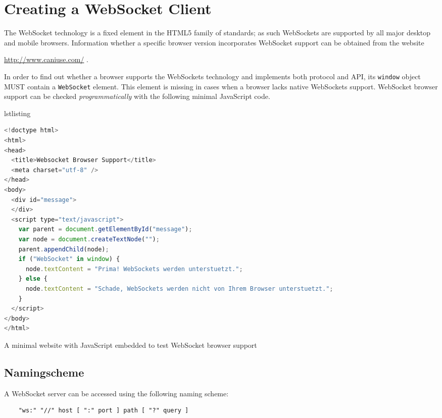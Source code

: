 \documentclass[a4paper, justified, notoc]{tufte-handout} %
\makeatletter
\newenvironment{listing}[1][htbp] %
  {\ifvmode\else\unskip\fi\begin{@tufte@float}[#1]{lstlisting}{}}
  {\end{@tufte@float} } %
\makeatother
\begin{document}
\section{Creating a WebSocket Client} %
\label{sec:creating_a_websocket_client}
The WebSocket technology is a fixed element in the HTML5 family of standards; as such WebSockets are supported by all major desktop and mobile browsers. Information whether a specific browser version incorporates WebSocket support can be obtained from the website 

\url{http://www.caniuse.com/} .

In order to find out whether a browser supports the WebSockets technology and implements both protocol and API, its \texttt{window} object MUST contain a \texttt{WebSocket} element. This element is missing in cases when a browser lacks native WebSockets support. WebSocket browser support can be checked \emph{programmatically} with the following minimal JavaScript code.

\begin{listing}
\begin{lstlisting}[language=JavaScript]
<!doctype html>
<html>
<head>
  <title>Websocket Browser Support</title>
  <meta charset="utf-8" />
</head>
<body>
  <div id="message">
  </div>
  <script type="text/javascript">
    var parent = document.getElementById("message");
    var node = document.createTextNode("");
    parent.appendChild(node);
    if ("WebSocket" in window) {
      node.textContent = "Prima! WebSockets werden unterstuetzt.";
    } else {
      node.textContent = "Schade, WebSockets werden nicht von Ihrem Browser unterstuetzt.";
    }
  </script>
</body>
</html>	
\end{lstlisting}
	\caption{A minimal website with JavaScript embedded to test WebSocket browser support} 
	\label{plain_server}
\end{listing}
 
\subsection{Namingscheme} %
\label{sub:namingscheme}

A WebSocket server can be accessed using the following naming scheme:
\begin{Verbatim}
	"ws:" "//" host [ ":" port ] path [ "?" query ]
\end{Verbatim}
\end{document}
